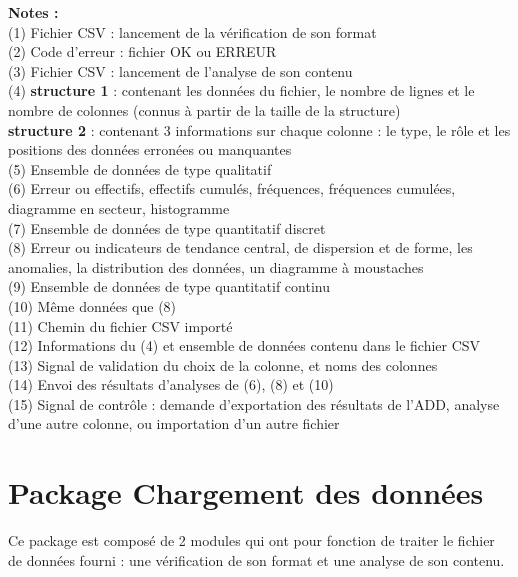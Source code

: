 				\textbf{Notes :}\\
				(1) Fichier CSV : lancement de la vérification de son format\\
				(2) Code d'erreur : fichier OK ou ERREUR\\
				(3) Fichier CSV : lancement de l'analyse de son contenu\\
				(4) \textbf{structure 1} : contenant les données du fichier, le nombre de lignes et le nombre de colonnes (connus à partir de la taille de la structure)\\
				\hspace*{1.5em} \textbf{structure 2} : contenant 3 informations sur chaque colonne : le type, le rôle et les positions des données erronées ou manquantes\\
				(5) Ensemble de données de type qualitatif\\
				(6) Erreur ou effectifs, effectifs cumulés, fréquences, fréquences cumulées, diagramme en secteur, histogramme\\
				(7) Ensemble de données de type quantitatif discret\\
				(8) Erreur ou indicateurs de tendance central, de dispersion et de forme, les anomalies, la distribution des données, un diagramme à moustaches\\
				(9) Ensemble de données de type quantitatif continu\\
				(10) Même données que (8)\\
				(11) Chemin du fichier CSV importé \\
				(12) Informations du (4) et ensemble de données contenu dans le fichier CSV \\
				(13) Signal de validation du choix de la colonne, et noms des colonnes\\
				(14) Envoi des résultats d'analyses de (6), (8) et (10)\\
				(15) Signal de contrôle : demande d'exportation des résultats de l'ADD, analyse d'une autre colonne, ou importation d'un autre fichier\\
		
	\section{Package Chargement des données}
	Ce package est composé de 2 modules qui ont pour fonction de traiter le fichier de données fourni : une vérification de son format et une analyse de son contenu.
		
